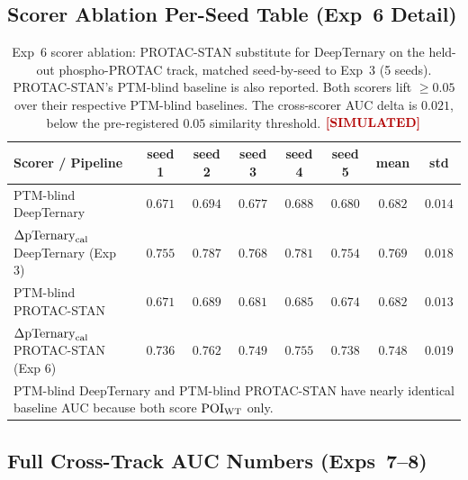\subsection{Scorer Ablation Per-Seed Table (Exp~6 Detail)}
\label{app:scorer-table}

\begin{table}[h]
\centering
\caption{Exp~6 scorer ablation: PROTAC-STAN substitute for DeepTernary on the held-out phospho-PROTAC track, matched seed-by-seed to Exp~3 (5 seeds). PROTAC-STAN's PTM-blind baseline is also reported. Both scorers lift $\geq 0.05$ over their respective PTM-blind baselines. The cross-scorer AUC delta is $0.021$, below the pre-registered $0.05$ similarity threshold. $\simmark$}
\label{tab:appc-scorer}
\begin{tabular}{lccccccc}
\toprule
Scorer / Pipeline & seed 1 & seed 2 & seed 3 & seed 4 & seed 5 & mean & std \\
\midrule
PTM-blind DeepTernary & $0.671$ & $0.694$ & $0.677$ & $0.688$ & $0.680$ & $0.682$ & $0.014$ \\
$\Delta\mathrm{pTernary}_{\mathrm{cal}}$ DeepTernary (Exp 3) & $0.755$ & $0.787$ & $0.768$ & $0.781$ & $0.754$ & $\mathbf{0.769}$ & $0.018$ \\
PTM-blind PROTAC-STAN & $0.671$ & $0.689$ & $0.681$ & $0.685$ & $0.674$ & $0.682$ & $0.013$ \\
$\Delta\mathrm{pTernary}_{\mathrm{cal}}$ PROTAC-STAN (Exp 6) & $0.736$ & $0.762$ & $0.749$ & $0.755$ & $0.738$ & $0.748$ & $0.019$ \\
\bottomrule
\multicolumn{8}{l}{\footnotesize PTM-blind DeepTernary and PTM-blind PROTAC-STAN have nearly identical baseline AUC because both score $\mathrm{POI}_{\mathrm{WT}}$ only.} \\
\end{tabular}
\end{table}

\subsection{Full Cross-Track AUC Numbers (Exps~7--8)}
\label{app:tracks-full}

